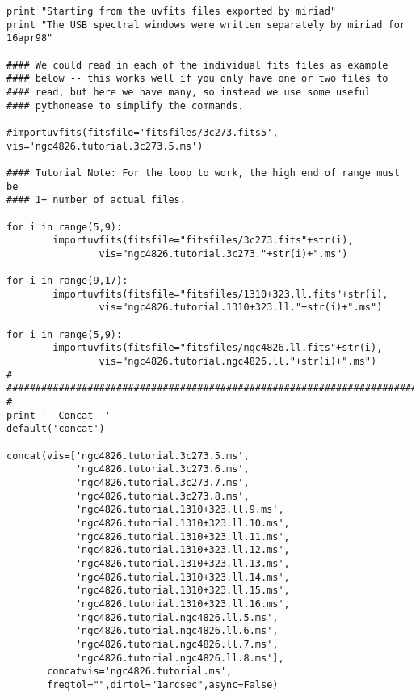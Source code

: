 \begin{verbatim}
print "Starting from the uvfits files exported by miriad"
print "The USB spectral windows were written separately by miriad for 16apr98"

#### We could read in each of the individual fits files as example
#### below -- this works well if you only have one or two files to
#### read, but here we have many, so instead we use some useful
#### pythonease to simplify the commands.

#importuvfits(fitsfile='fitsfiles/3c273.fits5', vis='ngc4826.tutorial.3c273.5.ms')

#### Tutorial Note: For the loop to work, the high end of range must be
#### 1+ number of actual files.

for i in range(5,9):
        importuvfits(fitsfile="fitsfiles/3c273.fits"+str(i),
                vis="ngc4826.tutorial.3c273."+str(i)+".ms")

for i in range(9,17):
        importuvfits(fitsfile="fitsfiles/1310+323.ll.fits"+str(i),
                vis="ngc4826.tutorial.1310+323.ll."+str(i)+".ms")

for i in range(5,9):
        importuvfits(fitsfile="fitsfiles/ngc4826.ll.fits"+str(i),
                vis="ngc4826.tutorial.ngc4826.ll."+str(i)+".ms")
#
##########################################################################
#
print '--Concat--'
default('concat')

concat(vis=['ngc4826.tutorial.3c273.5.ms',
            'ngc4826.tutorial.3c273.6.ms',
            'ngc4826.tutorial.3c273.7.ms',
            'ngc4826.tutorial.3c273.8.ms',
            'ngc4826.tutorial.1310+323.ll.9.ms',
            'ngc4826.tutorial.1310+323.ll.10.ms',
            'ngc4826.tutorial.1310+323.ll.11.ms',
            'ngc4826.tutorial.1310+323.ll.12.ms',
            'ngc4826.tutorial.1310+323.ll.13.ms',
            'ngc4826.tutorial.1310+323.ll.14.ms',
            'ngc4826.tutorial.1310+323.ll.15.ms',
            'ngc4826.tutorial.1310+323.ll.16.ms',
            'ngc4826.tutorial.ngc4826.ll.5.ms',
            'ngc4826.tutorial.ngc4826.ll.6.ms',
            'ngc4826.tutorial.ngc4826.ll.7.ms',
            'ngc4826.tutorial.ngc4826.ll.8.ms'],
       concatvis='ngc4826.tutorial.ms',
       freqtol="",dirtol="1arcsec",async=False)


\end{verbatim}
